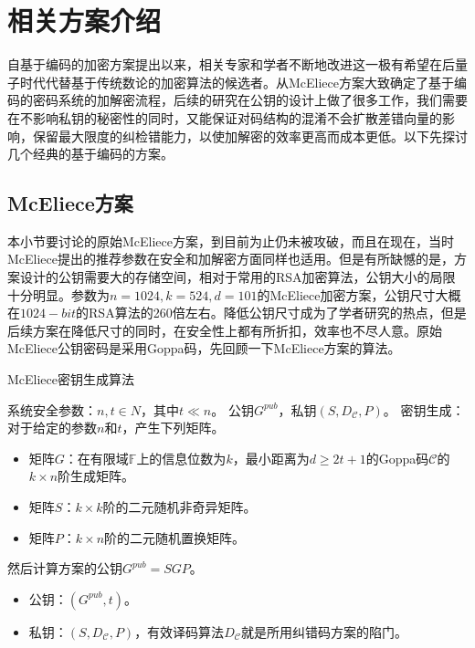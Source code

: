 \chapter{相关方案介绍}
\vspace{-0.2cm}
自基于编码的加密方案提出以来，相关专家和学者不断地改进这一极有希望在后量子时代代替基于传统数论的加密算法的候选者。从McEliece方案大致确定了基于编码的密码系统的加解密流程，后续的研究在公钥的设计上做了很多工作，我们需要在不影响私钥的秘密性的同时，又能保证对码结构的混淆不会扩散差错向量的影响，保留最大限度的纠检错能力，以使加解密的效率更高而成本更低。以下先探讨几个经典的基于编码的方案。
\section{McEliece方案}
本小节要讨论的原始McEliece方案，到目前为止仍未被攻破，而且在现在，当时McEliece提出的推荐参数在安全和加解密方面同样也适用。但是有所缺憾的是，方案设计的公钥需要大的存储空间，相对于常用的RSA加密算法，公钥大小的局限十分明显。参数为$n=1024,k=524,d=101$的McEliece加密方案，公钥尺寸大概在$1024-bit$的RSA算法的260倍左右。降低公钥尺寸成为了学者研究的热点，但是后续方案在降低尺寸的同时，在安全性上都有所折扣，效率也不尽人意。原始McEliece公钥密码是采用Goppa码，先回顾一下McEliece方案的算法。

\begin{breakablealgorithm}
	\small
	\renewcommand{\algorithmicrequire}{\textbf{Input:}}
	\renewcommand{\algorithmicensure}{\textbf{Output:}}
	\caption{McEliece密钥生成算法}
	\label{alg:McElieceKeyGen}
	\begin{algorithmic}[1]
		\Require
		系统安全参数：$n,t \in N$，其中$t \ll n$。
		\Ensure
		公钥$G^{pub}$，私钥$(S,D_\mathcal{C},P)$。
		\State
		密钥生成：对于给定的参数$n$和$t$，产生下列矩阵。
		\begin{itemize}
			\item 矩阵$G$：在有限域$\mathbb{F}$上的信息位数为$k$，最小距离为$d \geq 2t + 1$的Goppa码$\mathcal{C}$的$k \times n$阶生成矩阵。
			\item 矩阵$S$：$k \times k$阶的二元随机非奇异矩阵。
			\item 矩阵$P$：$k \times n$阶的二元随机置换矩阵。
		\end{itemize}	    
		\State
		然后计算方案的公钥$G^{pub} = SGP$。
		\begin{itemize}
			\item 公钥：$(G^{pub},t)$。
			\item 私钥：$(S,D_\mathcal{C},P)$，有效译码算法$D_\mathcal{C}$就是所用纠错码方案的陷门。
		\end{itemize}
	\end{algorithmic}
\end{breakablealgorithm}

